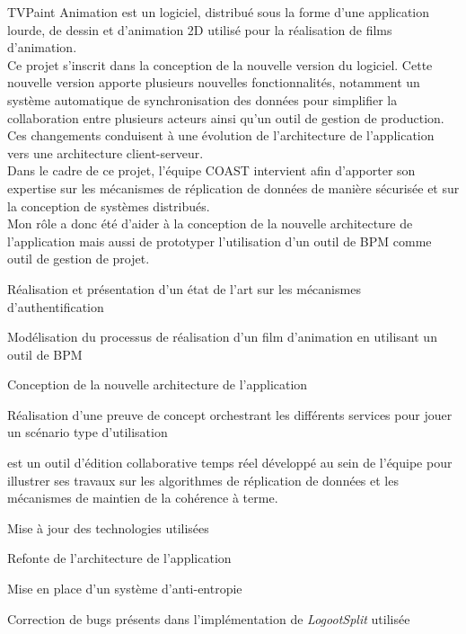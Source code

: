 \documentclass[]{deedy-resume-openfont}
\begin{document}
TVPaint Animation est un logiciel, distribué sous la forme d'une application lourde, de dessin et d'animation 2D utilisé pour la réalisation de films d'animation.
\\
Ce projet s'inscrit dans la conception de la nouvelle version du logiciel.
Cette nouvelle version apporte plusieurs nouvelles fonctionnalités,
notamment un système automatique de synchronisation des données pour simplifier la collaboration entre plusieurs acteurs
ainsi qu'un outil de gestion de production.
Ces changements conduisent à une évolution de l'architecture de l'application vers une architecture client-serveur.
\\
Dans le cadre de ce projet, l'équipe COAST intervient afin d'apporter son expertise sur les mécanismes de réplication de données de manière sécurisée
et sur la conception de systèmes distribués.
\\
Mon rôle a donc été d'aider à la conception de la nouvelle architecture de l'application
mais aussi de prototyper l'utilisation d'un outil de BPM comme outil de gestion de projet.
\begin{tightemize}
\item Réalisation et présentation d'un état de l'art sur les mécanismes d'authentification
\item Modélisation du processus de réalisation d'un film d'animation en utilisant un outil de BPM
\item Conception de la nouvelle architecture de l'application
\item Réalisation d'une preuve de concept orchestrant les différents services pour jouer un scénario type d'utilisation
\end{tightemize}
\sectionsep

\href{https://www.coedit.re}{} est un outil d'édition collaborative temps réel développé au sein de l'équipe
pour illustrer ses travaux sur les algorithmes de réplication de données et les mécanismes de maintien de la cohérence à terme.
\begin{tightemize}
\item Mise à jour des technologies utilisées
\item Refonte de l'architecture de l'application
\item Mise en place d'un système d'anti-entropie
\item Correction de bugs présents dans l'implémentation de \emph{LogootSplit} utilisée
\end{tightemize}
\sectionsep
\end{document}
